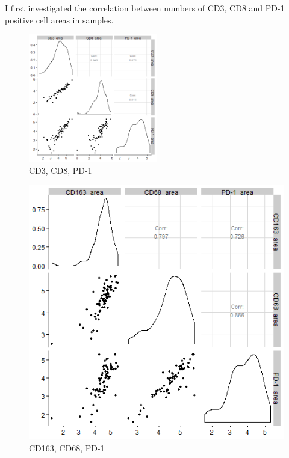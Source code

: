 I first investigated the correlation between numbers of CD3, CD8 and PD-1 positive cell areas in samples.

\begin{figure}
    \centering
    \includegraphics[width=0.5\textwidth]{Chapter4/figs/BRITROC_CD3_CD8_PD-1_corr.png}
    \caption{CD3, CD8, PD-1}
    \label{fig:CD8_CD3_PD1}
\end{figure}

\begin{figure}
    \centering
    \includegraphics{Chapter4/figs/BRITROC_CD163_CD68_PD-1_corr.png}
    \caption{CD163, CD68, PD-1}
    \label{fig:CD163_CD8_PD1}
\end{figure}

